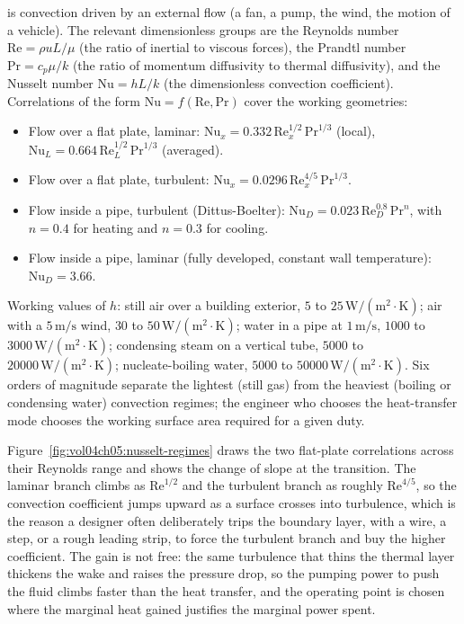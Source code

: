  is convection driven by an external
flow (a fan, a pump, the wind, the motion of a vehicle). The relevant
dimensionless groups are the Reynolds number $\text{Re} = \rho u
L/\mu$ (the ratio of inertial to viscous forces), the Prandtl number
$\text{Pr} = c_p \mu/k$ (the ratio of momentum diffusivity to thermal
diffusivity), and the Nusselt number $\text{Nu} = hL/k$ (the
dimensionless convection coefficient). Correlations of the form $\text{Nu}
= f(\text{Re}, \text{Pr})$ cover the working geometries:

\begin{itemize}[leftmargin=*]
  \item Flow over a flat plate, laminar: $\text{Nu}_x = 0.332\,
    \text{Re}_x^{1/2}\,\text{Pr}^{1/3}$ (local), $\text{Nu}_L = 0.664\,
    \text{Re}_L^{1/2}\,\text{Pr}^{1/3}$ (averaged).
  \item Flow over a flat plate, turbulent: $\text{Nu}_x = 0.0296\,
    \text{Re}_x^{4/5}\,\text{Pr}^{1/3}$.
  \item Flow inside a pipe, turbulent (Dittus-Boelter): $\text{Nu}_D
    = 0.023\,\text{Re}_D^{0.8}\,\text{Pr}^{n}$, with $n = 0.4$ for
    heating and $n = 0.3$ for cooling.
  \item Flow inside a pipe, laminar (fully developed, constant wall
    temperature): $\text{Nu}_D = 3.66$.
\end{itemize}

Working values of $h$: still air over a building exterior, $5$ to
$25\,\text{W}/(\text{m}^2\cdot\si{\kelvin})$; air with a $5\,\text{m/s}$
wind, $30$ to $50\,\text{W}/(\text{m}^2\cdot\si{\kelvin})$; water in a
pipe at $1\,\text{m/s}$, $1000$ to $3000\,\text{W}/(\text{m}^2\cdot
\si{\kelvin})$; condensing steam on a vertical tube, $5000$ to $20000\,
\text{W}/(\text{m}^2\cdot\si{\kelvin})$; nucleate-boiling water, $5000$
to $50000\,\text{W}/(\text{m}^2\cdot\si{\kelvin})$. Six orders of
magnitude separate the lightest (still gas) from the heaviest (boiling
or condensing water) convection regimes; the engineer who chooses the
heat-transfer mode chooses the working surface area required for a
given duty.



Figure~\ref{fig:vol04ch05:nusselt-regimes} draws the two flat-plate
correlations across their Reynolds range and shows the change of slope at
the transition. The laminar branch climbs as $\text{Re}^{1/2}$ and the
turbulent branch as roughly $\text{Re}^{4/5}$, so the convection
coefficient jumps upward as a surface crosses into turbulence, which is the
reason a designer often deliberately trips the boundary layer, with a wire,
a step, or a rough leading strip, to force the turbulent branch and buy the
higher coefficient. The gain is not free: the same turbulence that thins
the thermal layer thickens the wake and raises the pressure drop, so the
pumping power to push the fluid climbs faster than the heat transfer, and
the operating point is chosen where the marginal heat gained justifies the
marginal power spent.

